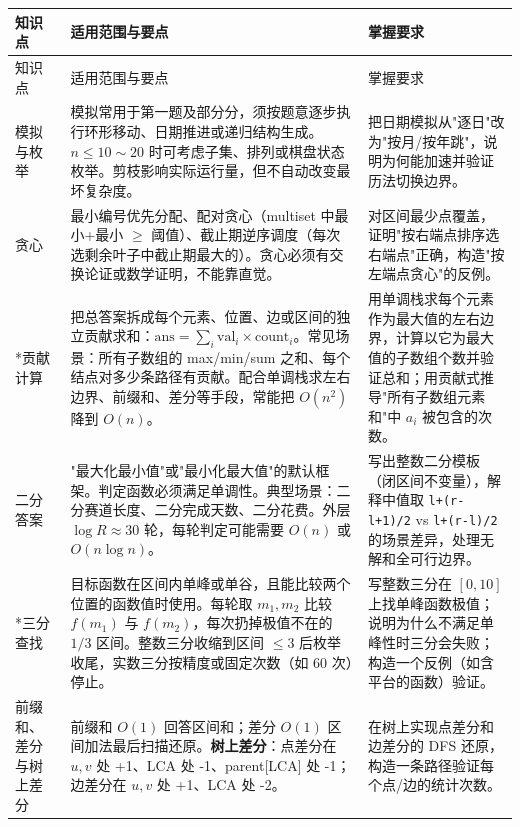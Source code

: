 \documentclass[a4paper,11pt]{article}
\newcommand{\code}[1]{\texttt{#1}}
\begin{document}
\begin{longtable}{L{2.4cm} L{7.5cm} L{6.8cm}}
\toprule
知识点 & 适用范围与要点 & 掌握要求 \\
\midrule
\endfirsthead
\toprule
知识点 & 适用范围与要点 & 掌握要求 \\
\midrule
\endhead
\endfoot
\bottomrule
\endlastfoot

模拟与枚举
& 模拟常用于第一题及部分分，须按题意逐步执行环形移动、日期推进或递归结构生成。$n\le10\sim20$ 时可考虑子集、排列或棋盘状态枚举。剪枝影响实际运行量，但不自动改变最坏复杂度。
& 把日期模拟从"逐日"改为"按月/按年跳"，说明为何能加速并验证历法切换边界。\\[2mm]

贪心
& 最小编号优先分配、配对贪心（multiset 中最小+最小 $\ge$ 阈值）、截止期逆序调度（每次选剩余叶子中截止期最大的）。贪心必须有交换论证或数学证明，不能靠直觉。
& 对区间最少点覆盖，证明"按右端点排序选右端点"正确，构造"按左端点贪心"的反例。\\[2mm]

*贡献计算
& 把总答案拆成每个元素、位置、边或区间的独立贡献求和：$\text{ans}=\sum_i \text{val}_i\times\text{count}_i$。常见场景：所有子数组的 max/min/sum 之和、每个结点对多少条路径有贡献。配合单调栈求左右边界、前缀和、差分等手段，常能把 $O(n^2)$ 降到 $O(n)$。
& 用单调栈求每个元素作为最大值的左右边界，计算以它为最大值的子数组个数并验证总和；用贡献式推导"所有子数组元素和"中 $a_i$ 被包含的次数。\\[2mm]

二分答案
& "最大化最小值"或"最小化最大值"的默认框架。判定函数必须满足单调性。典型场景：二分赛道长度、二分完成天数、二分花费。外层 $\log R\approx30$ 轮，每轮判定可能需要 $O(n)$ 或 $O(n\log n)$。
& 写出整数二分模板（闭区间不变量），解释中值取 \code{l+(r-l+1)/2} vs \code{l+(r-l)/2} 的场景差异，处理无解和全可行边界。\\[2mm]

*三分查找
& 目标函数在区间内单峰或单谷，且能比较两个位置的函数值时使用。每轮取 $m_1,m_2$ 比较 $f(m_1)$ 与 $f(m_2)$，每次扔掉极值不在的 $1/3$ 区间。整数三分收缩到区间 $\le 3$ 后枚举收尾，实数三分按精度或固定次数（如 60 次）停止。
& 写整数三分在 $[0,10]$ 上找单峰函数极值；说明为什么不满足单峰性时三分会失败；构造一个反例（如含平台的函数）验证。\\[2mm]

前缀和、差分与树上差分
& 前缀和 $O(1)$ 回答区间和；差分 $O(1)$ 区间加法最后扫描还原。\textbf{树上差分}：点差分在 $u,v$ 处 +1、LCA 处 -1、parent[LCA] 处 -1；边差分在 $u,v$ 处 +1、LCA 处 -2。
& 在树上实现点差分和边差分的 DFS 还原，构造一条路径验证每个点/边的统计次数。\\[2mm]


\end{longtable}
\end{document}

